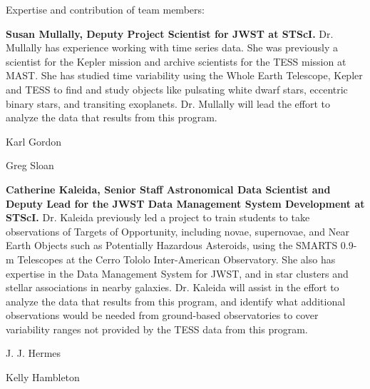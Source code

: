 Expertise and contribution of team members:

\textbf{Susan Mullally, Deputy Project Scientist for JWST at STScI.} Dr. Mullally has experience working with time series data. She was previously a scientist for the Kepler mission and archive scientists for the TESS mission at MAST.  She has studied time variability using the Whole Earth Telescope, Kepler and TESS to find and study objects like pulsating white dwarf stars, eccentric binary stars, and transiting exoplanets.  Dr. Mullally will lead the effort to analyze the data that results from this program.


Karl Gordon


Greg Sloan


\textbf{Catherine Kaleida, Senior Staff Astronomical Data Scientist and Deputy Lead for the JWST Data Management System Development at  STScI.}  Dr. Kaleida previously led a project to train students to take observations of Targets of Opportunity, including novae, supernovae, and Near Earth Objects such as Potentially Hazardous Asteroids, using the SMARTS 0.9-m Telescopes at the Cerro Tololo Inter-American Observatory.  She also has expertise in the Data Management System for JWST, and in star clusters and stellar associations in nearby galaxies.  Dr. Kaleida will assist in the effort to analyze the data that results from this program, and identify what additional observations would be needed from ground-based observatories to cover variability ranges not provided by the TESS data from this program.

J. J. Hermes

Kelly Hambleton

